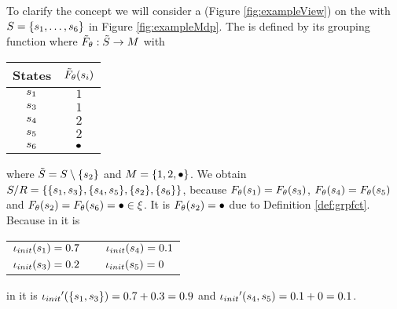 \documentclass[preview]{standalone}
\begin{document}
\begin{exmp}
To clarify the concept we will consider a \viewN \view (Figure \ref{fig:exampleView}) on the \mdpN \mdp with ${S} = \{{s}_1, \dots, {s}_6\}$ in Figure \ref{fig:exampleMdp}. The \viewN \view is defined by its grouping function \grpfct where ${\tilde{F}_{{\theta}}} : {\tilde{{S}}} \to {\ensuremath{{M}}}$ with 

\begin{table}[h]
	\centering
	\begin{tabular}{c|c}
		States & ${\tilde{F}_{{\theta}}}({s}_i)$\\
		\hline
		${s}_1$ & $1$\\
		${s}_3$ & $1$\\
		${s}_4$ & $2$\\
		${s}_5$ & $2$\\
		${s}_6$ & ${\bullet}$\\
	\end{tabular}
\end{table}
where ${\tilde{{S}}} = {S} \setminus \{{s}_2\}$ and ${{M}} = \{1,2,{\bullet}\}$. We obtain ${{{S}}/{R}} = \{\{{s}_1, {s}_3\}, \{{s}_4, {s}_5\}, \{{s}_2\}, \{{s}_6\}\}$, because ${F_{{\theta}}}({s}_1) = {F_{{\theta}}}({s}_3)$, ${F_{{\theta}}}({s}_4) = {F_{{\theta}}}({s}_5)$ and ${F_{{\theta}}}({s}_2) = {F_{{\theta}}}({s}_6) = {\bullet} \in {\xi}$. It is ${F_{{\theta}}}({s}_2) = {\bullet}$ due to Definition \ref{def:grpfct}. 
Because in \chgph it is 
\begin{center}
	\begin{tabular}{lcl}
		${\iota_{init}}({s}_1) = 0.7$ & \quad\quad & ${\iota_{init}}({s}_4) = 0.1$\\
		${\iota_{init}}({s}_3) = 0.2$ & \quad\quad & ${\iota_{init}}({s}_5) = 0$\\
	\end{tabular}
\end{center}
in \view it is ${\iota_{init}}'(\{{s}_1,{s}_3\}) = 0.7 + 0.3 = 0.9$ and ${\iota_{init}}'({s}_4, {s}_5) = 0.1 + 0 = 0.1$. \pagebreak


\end{exmp}
\end{document}
